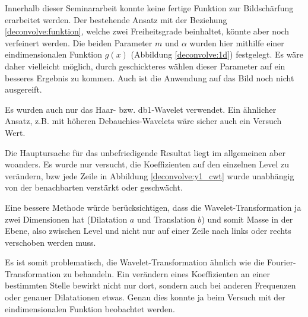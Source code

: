 Innerhalb dieser Seminararbeit konnte keine fertige Funktion zur Bildschärfung erarbeitet werden.
Der bestehende Ansatz mit der Beziehung \eqref{deconvolve:funktion}, welche zwei Freiheitsgrade beinhaltet, könnte aber noch verfeinert werden.
Die beiden Parameter $m$ und $\alpha$ wurden hier mithilfe einer eindimensionalen Funktion $g(x)$ (Abbildung \ref{deconvolve:1d}) festgelegt.
Es wäre daher vielleicht möglich, durch geschickteres wählen dieser Parameter auf ein besseres Ergebnis zu kommen.
Auch ist die Anwendung auf das Bild noch nicht ausgereift.

Es wurden auch nur das Haar- bzw. db1-Wavelet verwendet.
Ein ähnlicher Ansatz, z.B. mit höheren Debauchies-Wavelets wäre sicher auch ein Versuch Wert.

Die Hauptursache für das unbefriedigende Resultat liegt im allgemeinen aber woanders.
Es wurde nur versucht, die Koeffizienten auf den einzelnen Level zu verändern, bzw jede Zeile in Abbildung \ref{deconvolve:y1_cwt} wurde unabhängig von der benachbarten verstärkt oder geschwächt.

Eine bessere Methode würde berücksichtigen, dass die Wavelet-Transformation ja zwei Dimensionen hat (Dilatation $a$ und Translation $b$) und somit \glqq Masse \grqq{} in der Ebene, also zwischen Level und nicht nur auf einer Zeile nach links oder rechts verschoben werden muss.

Es ist somit problematisch, die Wavelet-Transformation ähnlich wie die Fourier-Transformation zu behandeln.
Ein verändern eines Koeffizienten an einer bestimmten Stelle bewirkt nicht nur dort, sondern auch bei anderen Frequenzen oder genauer Dilatationen etwas.
Genau dies konnte ja beim Versuch mit der eindimensionalen Funktion beobachtet werden.

